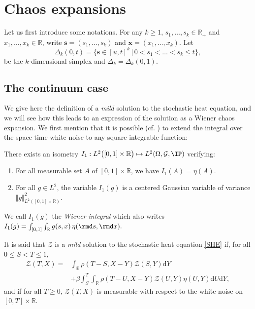 \section{Chaos expansions}
Let us first introduce some notations.
For any $k\geq 1$, $s_1,\dots,s_k \in \mathbb{R}_+$ and $x_1,\dots,x_k \in \mathbb{R}$, write $\mathbf{s}=(s_1,\dots,s_k)$ and $\mathbf{x}=(x_1,\dots,x_k)$. Let 
\begin{equation}\Delta_k(0,t)=\{\mathbf{s}\in [u,t]^k \,|\, 0<s_1<\dots<s_k\leq t\},
\end{equation}
be the $k$-dimensional simplex and $\Delta_k=\Delta_k(0,1)$.

\subsection{The continuum case}
\label{subsec:constructionofP2P}
We give here the definition of a \emph{mild} solution to the stochastic heat equation, and we will see how this leads to an expression of the solution as a Wiener chaos expansion.
We first mention that it is possible (cf. \cite{janson_1997}) to extend the integral over the space time white noise to any square integrable function:
\begin{proposition}
There exists an isometry $I_1 : L^2\big([0,1]\times\mathbb{R}\big) \mapsto L^2(\Omega,\mathcal{G},\IP)$ verifying:
\begin{enumerate}[label=(\roman*)]
\item For all measurable set $A$ of $[0,1]\times\mathbb{R}$, we have $I_1(A) = \eta(A)$.
\item For all $g\in L^2$, the variable $I_1(g)$ is a centered Gaussian variable of variance $\Vert g \Vert^2_{L^2([0,1]\times \mathbb{R})}$.
\end{enumerate}
\end{proposition}
\noindent We call $I_1(g)$ the \emph{Wiener integral} which also writes $I_1(g) = \int_{[0,1]}\int_{\mathbb{R}} g(s,x) \, \eta(\rmd s,\rmd x).$

It is said that $\mathcal Z$ is a \emph{mild} solution to the stochastic heat equation \eqref{SHE} if, for all $0 \leq S <T\leq 1$,
\begin{equation} \label{eq:mildSHE}
\begin{split}
\mathcal{Z}(T,X) = & \int_{\mathbb{R}} \rho(T-S,X-Y)\mathcal{Z}(S,Y)\mathrm{d}Y \\
&+\beta \int_S^T \int_{\mathbb{R}} \rho(T-U,X-Y) \mathcal{Z}(U,Y) \eta(U,Y) \mathrm{d}U \mathrm{d}Y,
\end{split}
\end{equation}
and if for all $T\geq 0$, $\mathcal{Z}(T,X)$ is measurable with respect to the white noise on $[0,T]\times\mathbb{R}$.


